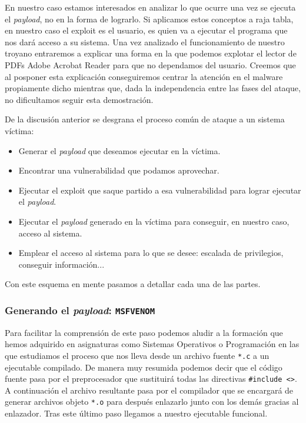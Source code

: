 \documentclass[12pt]{article}
\newcommand{\newpar} {
    \vskip 0.5cm
}
\begin{document}
                \newpar

                En nuestro caso estamos interesados en analizar lo que ocurre una vez se ejecuta el \textit{payload}, no en la forma de lograrlo. Si aplicamos estos conceptos a raja tabla, en nuestro caso el exploit es el usuario, es quien va a ejecutar el programa que nos dará acceso a su sistema. Una vez analizado el funcionamiento de nuestro troyano entraremos a explicar una forma en la que podemos explotar el lector de PDFs Adobe Acrobat Reader para que no dependamos del usuario. Creemos que al posponer esta explicación conseguiremos centrar la atención en el malware propiamente dicho mientras que, dada la independencia entre las fases del ataque, no dificultamos seguir esta demostración.

                \newpar

                De la discusión anterior se desgrana el proceso común de ataque a un sistema víctima:

                \begin{itemize}
                    \item Generar el \textit{payload} que deseamos ejecutar en la víctima.
                    \item Encontrar una vulnerabilidad que podamos aprovechar.
                    \item Ejecutar el exploit que saque partido a esa vulnerabilidad para lograr ejecutar el \textit{payload}.
                    \item Ejecutar el \textit{payload} generado en la víctima para conseguir, en nuestro caso, acceso al sistema.
                    \item Emplear el acceso al sistema para lo que se desee: escalada de privilegios, conseguir información...
                \end{itemize}


                Con este esquema en mente pasamos a detallar cada una de las partes.

            \subsubsection{Generando el \textit{payload}: \texttt{MSFVENOM}}
                Para facilitar la comprensión de este paso podemos aludir a la formación que hemos adquirido en asignaturas como Sistemas Operativos o Programación en las que estudiamos el proceso que nos lleva desde un archivo fuente \texttt{*.c} a un ejecutable compilado. De manera muy resumida podemos decir que el código fuente pasa por el preprocesador que sustituirá todas las directivas \texttt{\#include <>}. A continuación el archivo resultante pasa por el compilador que se encargará de generar archivos objeto \texttt{*.o} para después enlazarlo junto con los demás gracias al enlazador. Tras este último paso llegamos a nuestro ejecutable funcional.
\end{document}
